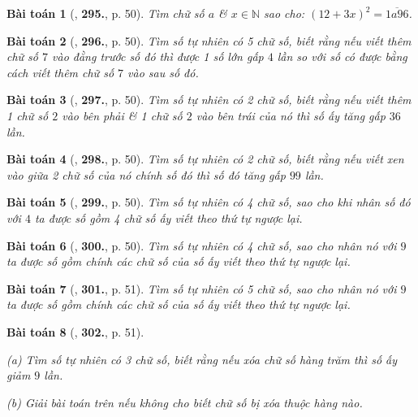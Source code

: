 \documentclass{article}
\numberwithin{equation}{section}
\newtheorem{baitoan}{Bài toán}
\begin{document}
\begin{baitoan}[\cite{Binh_Toan_6_tap_1}, \textbf{295.}, p. 50]
	Tìm chữ số $a$ \& $x\in\mathbb{N}$ sao cho: $(12 + 3x)^2 = \overline{1a96}$.
\end{baitoan}

\begin{baitoan}[\cite{Binh_Toan_6_tap_1}, \textbf{296.}, p. 50]
	Tìm số tự nhiên có 5 chữ số, biết rằng nếu viết thêm chữ số $7$ vào đằng trước số đó thì được 1 số lớn gấp $4$ lần so với số có được bằng cách viết thêm chữ số $7$ vào sau số đó.
\end{baitoan}

\begin{baitoan}[\cite{Binh_Toan_6_tap_1}, \textbf{297.}, p. 50]
	Tìm số tự nhiên có 2 chữ số, biết rằng nếu viết thêm 1 chữ số $2$ vào bên phải \& 1 chữ số $2$ vào bên trái của nó thì số ấy tăng gấp $36$ lần.
\end{baitoan}

\begin{baitoan}[\cite{Binh_Toan_6_tap_1}, \textbf{298.}, p. 50]
	Tìm số tự nhiên có 2 chữ số, biết rằng nếu viết xen vào giữa 2 chữ số của nó chính số đó thì số đó tăng gấp $99$ lần.
\end{baitoan}

\begin{baitoan}[\cite{Binh_Toan_6_tap_1}, \textbf{299.}, p. 50]
	Tìm số tự nhiên có 4 chữ số, sao cho khi nhân số đó với $4$ ta được số gồm 4 chữ số ấy viết theo thứ tự ngược lại.
\end{baitoan}

\begin{baitoan}[\cite{Binh_Toan_6_tap_1}, \textbf{300.}, p. 50]
	Tìm số tự nhiên có 4 chữ số, sao cho nhân nó với $9$ ta được số gồm chính các chữ số của số ấy viết theo thứ tự ngược lại.
\end{baitoan}

\begin{baitoan}[\cite{Binh_Toan_6_tap_1}, \textbf{301.}, p. 51]
	Tìm số tự nhiên có 5 chữ số, sao cho nhân nó với $9$ ta được số gồm chính các chữ số của số ấy viết theo thứ tự ngược lại.
\end{baitoan}

\begin{baitoan}[\cite{Binh_Toan_6_tap_1}, \textbf{302.}, p. 51]
	\begin{enumerate*}
		\item[(a)] Tìm số tự nhiên có 3 chữ số, biết rằng nếu xóa chữ số hàng trăm thì số ấy giảm $9$ lần.
		\item[(b)] Giải bài toán trên nếu không cho biết chữ số bị xóa thuộc hàng nào.
	\end{enumerate*}
\end{baitoan}
\end{document}
